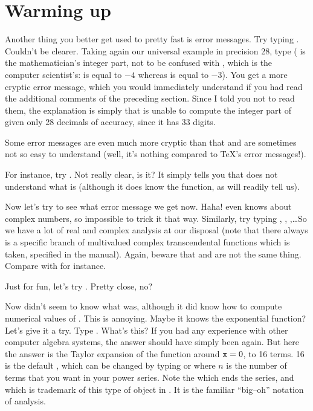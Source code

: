 \section{Warming up}

Another thing you better get used to pretty fast is error messages. Try
typing . Couldn't be clearer. Taking again our universal example in
precision 28, type  ( is the
mathematician's integer part, not to be confused with , which
is the computer scientist's:  is equal to $-4$ whereas
 is equal to $-3$).  You get a more cryptic error
message, which you would immediately understand if you had read the
additional comments of the preceding section. Since I told you not to read
them, the explanation is simply that  is unable to compute the
integer part of  given only 28 decimals of accuracy, since
it has 33 digits.

Some error messages are even much more cryptic than that and are sometimes
not so easy to understand (well, it's nothing compared to \TeX's error
messages!).

For instance, try . Not really clear, is it? It simply tells you
that  does not understand what  is (although it does know
the  function, as  will readily tell us).

Now let's try  to see what error message we get now. Haha!
 even knows about complex numbers, so impossible to trick it that
way. Similarly, try typing , , ,\dots So we have a lot of real and complex analysis at our disposal (note
that there always is a specific branch of multivalued complex transcendental
functions which is taken, specified in the manual). Again, beware that
 and  are not the same thing. Compare  with
 for instance.

Just for fun, let's try . Pretty close, no?

\medskip
Now  didn't seem to know what  was, although it did know
how to compute numerical values of . This is annoying. Maybe it
knows the exponential function? Let's give it a try. Type .
What's this? If you had any experience with other computer algebra systems,
the answer should have simply been  again. But here the answer is
the Taylor expansion of the function around ${\tt x}=0$, to 16 terms. 16 is
the default , which can be changed by typing  or  where $n$ is the number of terms
that you want in your power series. Note the  which ends the
series, and which is trademark of this type of object in . It is the
familiar ``big--oh'' notation of analysis.

